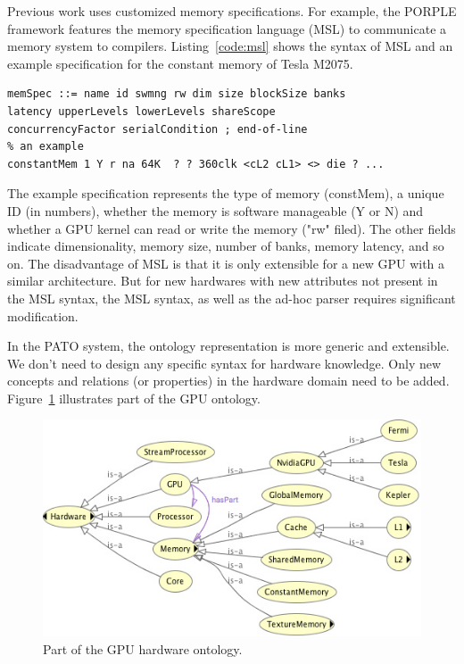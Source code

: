 Previous work uses customized memory specifications.  For example, the
PORPLE framework \cite{Chen2014} features the memory specification
language (MSL) to communicate a memory system to compilers.
Listing~\ref{code:msl} shows the syntax of MSL and an example
specification for the constant memory of Tesla M2075.

\begin{lstlisting}[basicstyle=\ttfamily\footnotesize, caption={PORPLE
      Memory Specification Language (? represents unknown attributes).}, label=code:msl]
% syntax 
memSpec ::= name id swmng rw dim size blockSize banks 
latency upperLevels lowerLevels shareScope 
concurrencyFactor serialCondition ; end-of-line
% an example 
constantMem 1 Y r na 64K  ? ? 360clk <cL2 cL1> <> die ? ... 
\end{lstlisting}
The example specification represents the type of memory (constMem), a unique ID (in numbers),  whether the memory is software manageable (Y or N) and whether a GPU kernel can read or write the memory ("rw" filed). 
The other fields indicate dimensionality, memory size, number of
banks, memory latency, and so on.  The disadvantage of MSL is that it is
only extensible for a new GPU with a similar architecture.  But for
new hardwares with new attributes not present in the MSL syntax, the
MSL syntax, as well as the ad-hoc parser requires significant
modification.

In the PATO system, the ontology representation is more generic and
extensible.  We don't need to design any specific syntax for hardware
knowledge.  Only new concepts and relations (or properties) in the
hardware domain need to be added. Figure~\ref{fig:gpu_onto}
illustrates part of the GPU ontology.
\begin{figure}[t]
	\centering
	\includegraphics[width=.6\columnwidth]{graph/gpu_onto.jpg}
	\caption{Part of the GPU hardware ontology.}
	\label{fig:gpu_onto}
\end{figure}

